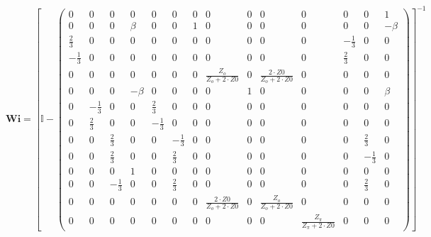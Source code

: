 \[ \mathbf{Wi} =  \left[ \mathbb{I}  - \left(\begin{smallmatrix} 0 & 0
& 0 & 0 & 0 & 0 & 0 & 0 & 0 & 0 & 0 & 0 & 0 & 1 \\ 0 & 0 & 0 & \beta &
0 & 0 & 1 & 0 & 0 & 0 & 0 & 0 & 0 & -\beta \\ \frac{2}{3} & 0 & 0 & 0
& 0 & 0 & 0 & 0 & 0 & 0 & 0 & -\frac{1}{3} & 0 & 0 \\ -\frac{1}{3} & 0
& 0 & 0 & 0 & 0 & 0 & 0 & 0 & 0 & 0 & \frac{2}{3} & 0 & 0 \\ 0 & 0 & 0
& 0 & 0 & 0 & 0 & \frac{Z_o}{Z_o+2\cdot Z0} & 0 & \frac{2\cdot
Z0}{Z_o+2\cdot Z0} & 0 & 0 & 0 & 0 \\ 0 & 0 & 0 & -\beta & 0 & 0 & 0 &
0 & 1 & 0 & 0 & 0 & 0 & \beta \\ 0 & -\frac{1}{3} & 0 & 0 &
\frac{2}{3} & 0 & 0 & 0 & 0 & 0 & 0 & 0 & 0 & 0 \\ 0 & \frac{2}{3} & 0
& 0 & -\frac{1}{3} & 0 & 0 & 0 & 0 & 0 & 0 & 0 & 0 & 0 \\ 0 & 0 &
\frac{2}{3} & 0 & 0 & -\frac{1}{3} & 0 & 0 & 0 & 0 & 0 & 0 &
\frac{2}{3} & 0 \\ 0 & 0 & \frac{2}{3} & 0 & 0 & \frac{2}{3} & 0 & 0 &
0 & 0 & 0 & 0 & -\frac{1}{3} & 0 \\ 0 & 0 & 0 & 1 & 0 & 0 & 0 & 0 & 0
& 0 & 0 & 0 & 0 & 0 \\ 0 & 0 & -\frac{1}{3} & 0 & 0 & \frac{2}{3} & 0
& 0 & 0 & 0 & 0 & 0 & \frac{2}{3} & 0 \\ 0 & 0 & 0 & 0 & 0 & 0 & 0 &
\frac{2\cdot Z0}{Z_o+2\cdot Z0} & 0 & \frac{Z_o}{Z_o+2\cdot Z0} & 0 &
0 & 0 & 0 \\ 0 & 0 & 0 & 0 & 0 & 0 & 0 & 0 & 0 & 0 &
\frac{Z_{\pi}}{Z_{\pi}+2\cdot Z0} & 0 & 0 & 0 \end{smallmatrix}\right)
\right]^{-1}  \]
